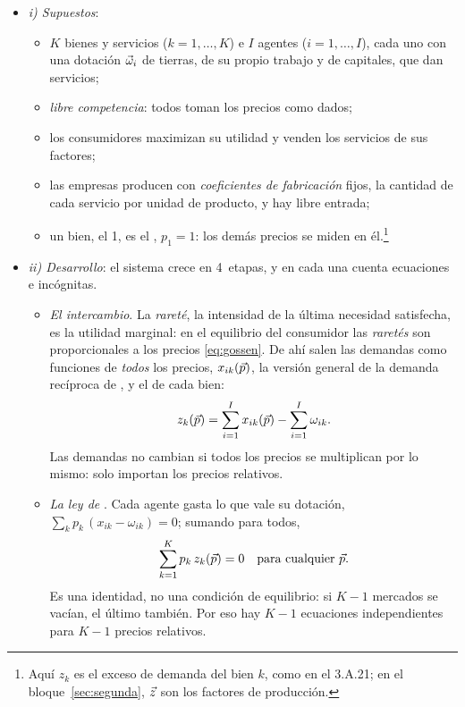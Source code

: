 \documentclass[11pt]{article}
\begin{document}
\begin{itemize}
\item \emph{i) Supuestos}:
  \begin{itemize}
  \item $K$ bienes y servicios ($k=1,\dots,K$) e $I$ agentes ($i=1,\dots,I$), cada uno con una dotación $\vec{\omega}_i$ de tierras, de su propio trabajo y de capitales, que dan servicios;
  \item \emph{libre competencia}: todos toman los precios como dados;
  \item los consumidores maximizan su utilidad y venden los servicios de sus factores;
  \item las empresas producen con \emph{coeficientes de fabricación} fijos, la cantidad de cada servicio por unidad de producto, y hay libre entrada;
  \item un bien, el 1, es el , $p_1=1$: los demás precios se miden en él.\footnote{Aquí $z_k$ es el exceso de demanda del bien $k$, como en el 3.A.21; en el bloque~\ref{sec:segunda}, $\vec{z}$ son los factores de producción.}
  \end{itemize}
\item \emph{ii) Desarrollo}: el sistema crece en 4~etapas, y en cada una  cuenta ecuaciones e incógnitas.
  \begin{itemize}
  \item \emph{El intercambio}. La \emph{rareté}, la intensidad de la última necesidad satisfecha, es la utilidad marginal: en el equilibrio del consumidor las \emph{raretés} son proporcionales a los precios \eqref{eq:gossen}. De ahí salen las demandas como funciones de \emph{todos} los precios, $x_{ik}(\vec{p})$, la versión general de la demanda recíproca de , y el  de cada bien:
  \begin{equation}
  z_k(\vec{p})=\sum_{i=1}^{I}x_{ik}(\vec{p})-\sum_{i=1}^{I}\omega_{ik}. \label{eq:exceso-walras}
  \end{equation}
  Las demandas no cambian si todos los precios se multiplican por lo mismo: solo importan los precios relativos.
  \item \emph{La ley de }. Cada agente gasta lo que vale su dotación, $\sum_k p_k\,(x_{ik}-\omega_{ik})=0$; sumando para todos,
  \begin{equation}
  \sum_{k=1}^{K}p_k\,z_k(\vec{p})=0\quad\text{para cualquier }\vec{p}. \label{eq:ley-walras}
  \end{equation}
  Es una identidad, no una condición de equilibrio: si $K-1$ mercados se vacían, el último también. Por eso hay $K-1$ ecuaciones independientes para $K-1$ precios relativos.

\end{itemize}
\end{itemize}
\end{document}
